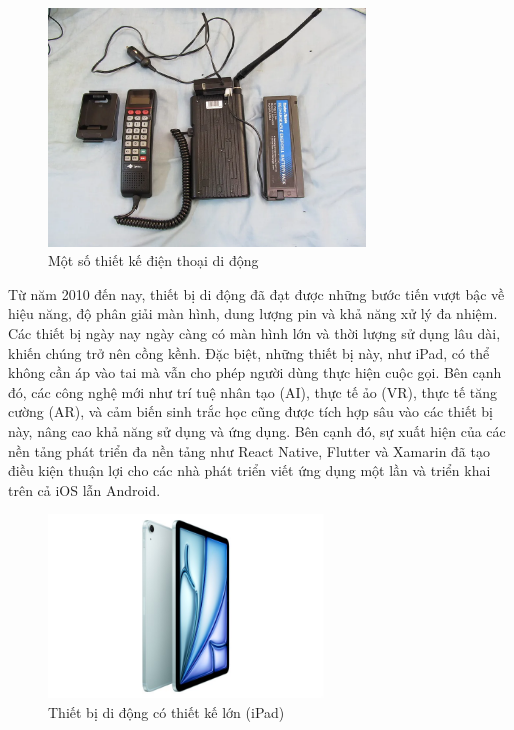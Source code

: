     \begin{figure}[h]
      \centering
      \includegraphics[width=0.75\textwidth]{images/thiet_ke_dtdd.png}
      \caption{Một số thiết kế điện thoại di động}
      \label{fig:fig2}
    \end{figure}

\begin{flushleft}
  \hspace*{0.8cm}
  Từ năm 2010 đến nay, thiết bị di động đã đạt được những bước tiến vượt bậc về hiệu năng, độ phân giải màn hình, dung lượng pin và khả năng xử lý đa nhiệm. Các thiết bị ngày nay ngày càng có màn hình lớn và thời lượng sử dụng lâu dài, khiến chúng trở nên cồng kềnh. Đặc biệt, những thiết bị này, như iPad, có thể không cần áp vào tai mà vẫn cho phép người dùng thực hiện cuộc gọi. Bên cạnh đó, các công nghệ mới như trí tuệ nhân tạo (AI), thực tế ảo (VR), thực tế tăng cường (AR), và cảm biến sinh trắc học cũng được tích hợp sâu vào các thiết bị này, nâng cao khả năng sử dụng và ứng dụng. Bên cạnh đó, sự xuất hiện của các nền tảng phát triển đa nền tảng như React Native, Flutter và Xamarin đã tạo điều kiện thuận lợi cho các nhà phát triển viết ứng dụng một lần và triển khai trên cả iOS lẫn Android.
\end{flushleft}

\begin{figure}[h]
  \centering
  \includegraphics[width=0.65\textwidth]{images/ipad.jpg}
  \caption{Thiết bị di động có thiết kế lớn (iPad)}
  \label{fig:fig3}
\end{figure}

